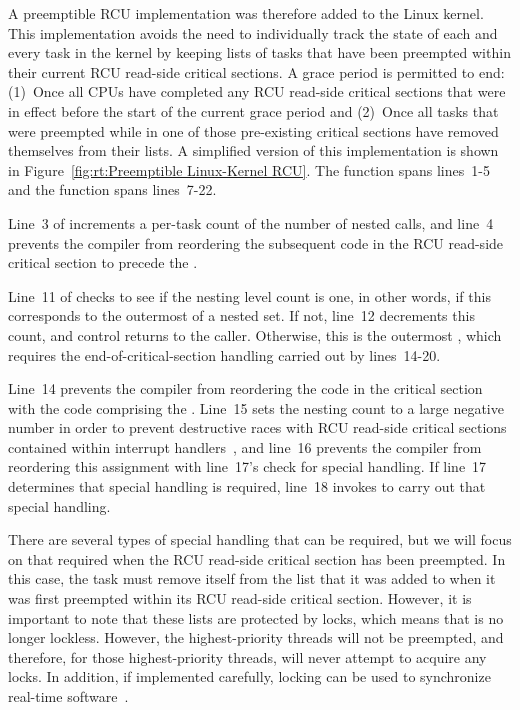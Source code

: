 A preemptible RCU implementation was therefore added to the Linux kernel.
This implementation avoids the need to individually track the state of
each and every task in the kernel by keeping lists of tasks that have
been preempted within their current RCU read-side critical sections.
A grace period is permitted to end: (1)~Once all CPUs have completed any
RCU read-side critical sections that were in effect before the start
of the current grace period and
(2)~Once all tasks that were preempted
while in one of those pre-existing critical sections have removed
themselves from their lists.
A simplified version of this implementation is shown in
Figure~\ref{fig:rt:Preemptible Linux-Kernel RCU}.
The  function spans lines~1-5 and
the  function spans lines~7-22.

Line~3 of  increments a per-task count of the
number of nested  calls, and
line~4 prevents the compiler from reordering the subsequent code in the
RCU read-side critical section to precede the .

Line~11 of  checks to see if the nesting level count
is one, in other words, if this corresponds to the outermost
 of a nested set.
If not, line~12 decrements this count, and control returns to the caller.
Otherwise, this is the outermost , which requires
the end-of-critical-section handling carried out by lines~14-20.

Line~14 prevents the compiler from reordering the code in the critical
section with the code comprising the .
Line~15 sets the nesting count to a large negative number in order to prevent
destructive races with RCU read-side critical sections contained within
interrupt handlers~\cite{PaulEMcKenney2011RCU3.0trainwreck},
and line~16 prevents the compiler from reordering this assignment with
line~17's check for special handling.
If line~17 determines that special handling is required, line~18
invokes  to carry out that special handling.

There are several types of special handling that can be required, but
we will focus on that required when the RCU read-side critical section
has been preempted.
In this case, the task must remove itself from the list that it was
added to when it was first preempted within its
RCU read-side critical section.
However, it is important to note that these lists are protected by locks,
which means that  is no longer lockless.
However, the highest-priority threads will not be preempted, and therefore,
for those highest-priority threads,  will never
attempt to acquire any locks.
In addition, if implemented carefully, locking can be used to synchronize
real-time software~\cite{BjoernBrandenburgPhD}.

